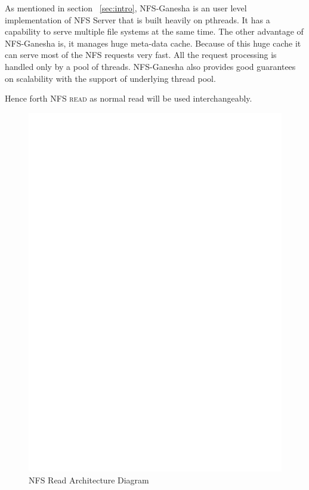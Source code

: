    As mentioned in section ~\ref{sec:intro}, NFS-Ganesha is an user level implementation of NFS Server that is built heavily on pthreads. It has a capability to serve multiple file systems at the same time. The other advantage of NFS-Ganesha is, it manages huge meta-data cache. Because of this huge cache it can serve most of the NFS requests very fast. All the request processing is handled only by a pool of threads. NFS-Ganesha also provides good guarantees on scalability with the support of underlying thread pool. 
   
  Hence forth \textsc{NFS read} as normal read will be used interchangeably.    

\begin{figure}
\centering
\includegraphics[scale=0.7]{figures/Read.eps}
\caption{NFS Read Architecture Diagram}
\label{fig:NFSReadArch}
\end{figure}


